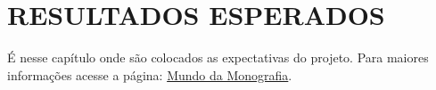 
\chapter{RESULTADOS ESPERADOS}
\label{resultadosesperados}

É nesse capítulo onde são colocados as expectativas do projeto. Para maiores informações acesse a página: \href{http://www.mundodamonografia.com.br/projeto-de-pesquisa-resultados/}{Mundo da Monografia}.

